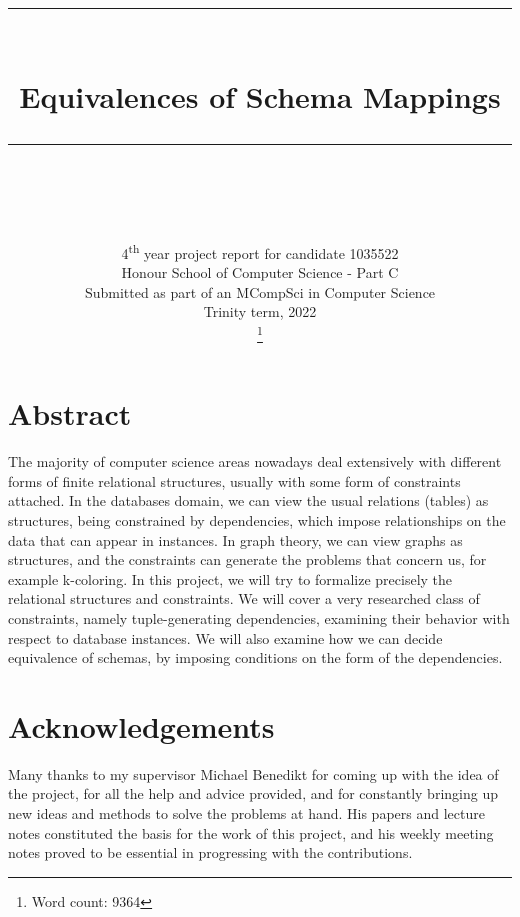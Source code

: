 \documentclass[11pt, a4paper, dvipsnames]{article}
\newcommand\blankpage{
    \null
    \thispagestyle{empty}%
    \addtocounter{page}{-1}%
    \newpage}
\newcommand{\HRule}[1]{\rule{\linewidth}{#1}}
\begin{document}
\title{ \normalsize \textsc{}
		\\ [2.0cm]
		\HRule{0.5pt} \\
		\LARGE \textbf{Equivalences of Schema Mappings}
		\HRule{0.5pt} \\ [0.5cm]
		\normalsize  \vspace*{3\baselineskip}}
\date{}
\author{
		4\textsuperscript{th} year project report for candidate 1035522\\
        Honour School of Computer Science - Part C\\
        Submitted as part of an MCompSci in Computer Science\\
		Trinity term, 2022\\ \footnote{Word count: 9364}	
		}

\maketitle
\thispagestyle{empty}
\newpage
\blankpage

\setcounter{page}{3}

\justifying

\section{Abstract}
The majority of computer science areas nowadays deal extensively with different forms of finite relational structures, usually with some form of constraints attached. In the databases domain, we can view the usual relations (tables) as structures, being constrained by dependencies, which impose relationships on the data that can appear in instances. In graph theory, we can view graphs as structures, and the constraints can generate the problems that concern us, for example k-coloring. In this project, we will try to formalize precisely the relational structures and constraints. We will cover a very researched class of constraints, namely tuple-generating dependencies, examining their behavior with respect to database instances. We will also examine how we can decide equivalence of schemas, by imposing conditions on the form of the dependencies.

\section{Acknowledgements}
Many thanks to my supervisor Michael Benedikt for coming up with the idea of the project, for all the help and advice provided, and for constantly bringing up new ideas and methods to solve the problems at hand. His papers and lecture notes constituted the basis for the work of this project, and his weekly meeting notes proved to be essential in progressing with the contributions.
\end{document}
